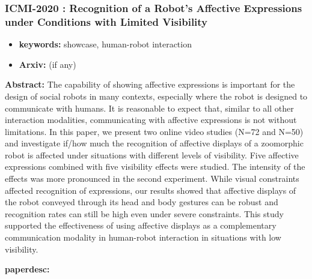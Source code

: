\documentclass{article}
\begin{document}
\newpage
\subsubsection{\textbf{ICMI-2020} : Recognition of a Robot's Affective Expressions under Conditions with Limited Visibility}
\begin{itemize}
\item \textbf{keywords:} showcase, human-robot interaction
\item \textbf{Arxiv:}  (if any)
\end{itemize}


\textbf{Abstract:} The capability of showing affective expressions is important for the design of social robots in many contexts, especially where the robot is designed to communicate with humans. It is reasonable to expect that, similar to all other interaction modalities, communicating with affective expressions is not without limitations. In this paper, we present two online video studies (N=72 and N=50) and investigate if/how much the recognition of affective displays of a zoomorphic robot is affected under situations with different levels of visibility. Five affective expressions combined with five visibility effects were studied. The intensity of the effects was more pronounced in the second experiment. While visual constraints affected recognition of expressions, our results showed that affective displays of the robot conveyed through its head and body gestures can be robust and recognition rates can still be high even under severe constraints. This study supported the effectiveness of using affective displays as a complementary communication modality in human-robot interaction in situations with low visibility.

\textbf{paperdesc:} 
\end{document}

